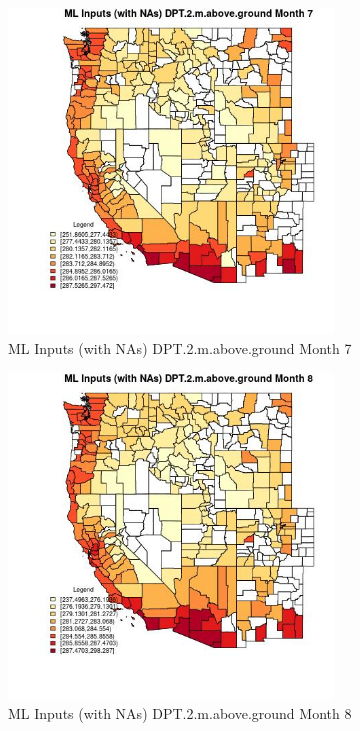 \begin{figure} 
\centering  
\includegraphics[width=0.77\textwidth]{Code_Outputs/Report_ML_input_PM25_Step4_part_e_de_duplicated_aves_compiled_2019-05-21wNAs_CountyDPT2mabovegroundmedianMonth7.jpg} 
\caption{\label{fig:Report_ML_input_PM25_Step4_part_e_de_duplicated_aves_compiled_2019-05-21wNAsCountyDPT2mabovegroundmedianMonth7}ML Inputs (with NAs) DPT.2.m.above.ground Month 7} 
\end{figure} 
 

\begin{figure} 
\centering  
\includegraphics[width=0.77\textwidth]{Code_Outputs/Report_ML_input_PM25_Step4_part_e_de_duplicated_aves_compiled_2019-05-21wNAs_CountyDPT2mabovegroundmedianMonth8.jpg} 
\caption{\label{fig:Report_ML_input_PM25_Step4_part_e_de_duplicated_aves_compiled_2019-05-21wNAsCountyDPT2mabovegroundmedianMonth8}ML Inputs (with NAs) DPT.2.m.above.ground Month 8} 
\end{figure} 
 

